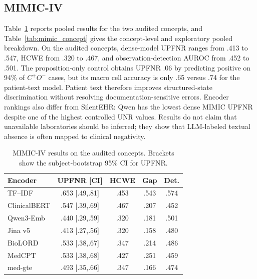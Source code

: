 \documentclass[11pt]{article}
\begin{document}
\subsection{MIMIC-IV}
Table~\ref{tab:mimic} reports pooled results for the two audited concepts, and
Table~\ref{tab:mimic_concept} gives the concept-level and exploratory pooled
breakdown. On the audited concepts, dense-model UPFNR ranges from .413 to .547, HCWE from
.320 to .467, and observation-detection AUROC from .452 to .501. The proposition-only control obtains UPFNR .06 by predicting positive on
94\% of $C^+O^-$ cases, but its macro cell accuracy is only .65 versus .74 for
the patient-text model. Patient text therefore improves structured-state
discrimination without resolving documentation-sensitive errors. Encoder
rankings also differ from SilentEHR: Qwen has the lowest dense MIMIC UPFNR
despite one of the highest controlled UNR values. Results do not claim that
unavailable laboratories should be inferred; they show that LLM-labeled textual
absence is often mapped to clinical negativity.


\begin{table}[t]
  \centering
  \scriptsize
  \setlength{\tabcolsep}{2.2pt}
  \renewcommand{\arraystretch}{1.06}
  \caption{MIMIC-IV results on the audited concepts. Brackets show the
  subject-bootstrap 95\% CI for UPFNR.}
  \label{tab:mimic}
  \begin{tabular*}{\columnwidth}{@{\extracolsep{\fill}}lcccc@{}}
    \toprule
    \textbf{Encoder} & \textbf{UPFNR [CI]} &
    \textbf{HCWE} & \textbf{Gap} & \textbf{Det.} \\
    \midrule
    TF--IDF      & .653 [.49,.81] & .453 & .543 & .574 \\
    ClinicalBERT & .547 [.39,.69] & .467 & .207 & .452 \\
    Qwen3-Emb    & .440 [.29,.59] & .320 & .181 & .501 \\
    Jina v5      & .413 [.27,.56] & .320 & .158 & .480 \\
    BioLORD      & .533 [.38,.67] & .347 & .214 & .486 \\
    MedCPT       & .533 [.38,.68] & .427 & .251 & .459 \\
    med-gte      & .493 [.35,.66] & .347 & .166 & .474 \\
    \bottomrule
  \end{tabular*}
\end{table}
\end{document}
